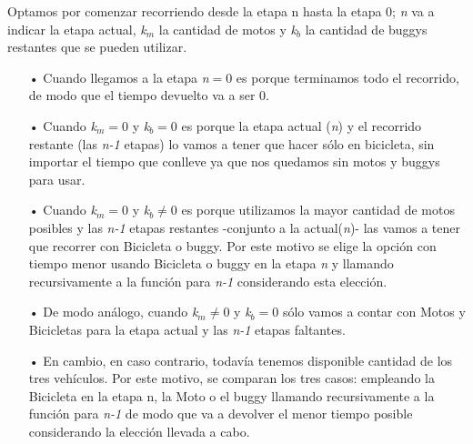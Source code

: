 Optamos por comenzar recorriendo desde la etapa n hasta la etapa 0; \emph{n} va a indicar la etapa actual, \emph{k$_m$} la cantidad de motos y \emph{k$_b$} la cantidad de buggys restantes que se pueden utilizar.

\begin{itemize}
\item[•]Cuando llegamos a la etapa \emph{n}$=0$ es porque terminamos todo el recorrido, de modo que el tiempo devuelto va a ser 0.

\item[•]Cuando \emph{k$_m$}$=0$ y \emph{k$_b$}$=0$ es porque la etapa actual (\emph{n}) y el recorrido restante (las \emph{n-1} etapas) lo vamos a tener que hacer s\'olo en bicicleta, sin importar el tiempo que conlleve ya que nos quedamos sin motos y buggys para usar.

\item[•]Cuando \emph{k$_m$}$=0$ y \emph{k$_b$}$\neq0$ es porque utilizamos la mayor cantidad de motos posibles y las \emph{n-1} etapas restantes -conjunto a la actual(\emph{n})- las vamos a tener que recorrer con Bicicleta o buggy. Por este motivo se elige la opci\'on con tiempo menor usando Bicicleta o buggy en la etapa \emph{n} y llamando recursivamente a la funci\'on para \emph{n-1} considerando esta elecci\'on.

\item[•]De modo an\'alogo, cuando \emph{k$_m$}$\neq0$ y \emph{k$_b$}$=0$ s\'olo vamos a contar con Motos y Bicicletas para la etapa actual y las \emph{n-1} etapas faltantes.

\item[•]En cambio, en caso contrario, todav\'ia tenemos disponible cantidad de los tres veh\'iculos. Por este motivo, se comparan los tres casos: empleando la Bicicleta en la etapa n, la Moto o el buggy llamando recursivamente a la funci\'on para \emph{n-1} de modo que va a devolver el menor tiempo posible considerando la elecci\'on llevada a cabo.
\end{itemize}



